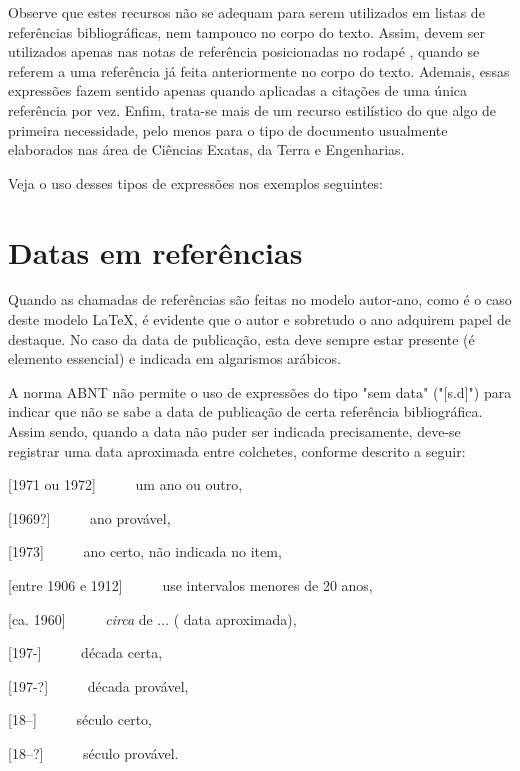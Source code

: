 \begin{apendicesenv}
Observe que estes recursos não se adequam para serem utilizados em listas de referências bibliográficas, nem tampouco no corpo do texto. Assim, devem ser utilizados apenas nas notas de referência posicionadas no rodapé \cite[p.~6]{abnTeX22014c}, quando se referem a uma referência já feita anteriormente no corpo do texto. Ademais, essas expressões fazem sentido apenas quando aplicadas a citações de uma única referência por vez. Enfim, trata-se mais de um recurso estilístico do que algo de primeira necessidade, pelo menos para o tipo de documento usualmente elaborados nas área de Ciências Exatas, da Terra e Engenharias.

Veja o uso desses tipos de expressões nos exemplos seguintes:







\section{Datas em referências}
\label{sec:datas_em_referencias}

Quando as chamadas de referências são feitas no modelo autor-ano, como é o caso deste modelo \LaTeX{}, é evidente que o autor e sobretudo o ano adquirem papel de destaque. No caso da data de publicação, esta deve sempre estar presente (é elemento essencial) e indicada em algarismos arábicos.

A norma ABNT não permite o uso de expressões do tipo "sem data"{} ("[s.d]") para indicar que não se sabe a data de publicação de certa referência bibliográfica. Assim sendo, quando a data não puder ser indicada precisamente, deve-se registrar uma data aproximada entre colchetes, conforme descrito a seguir:

[1971 ou 1972] \ \ \ \ \ um ano ou outro,

[1969?] \ \ \ \ \ ano provável,

[1973] \ \ \ \ \ ano certo, não indicada no item,

[entre 1906 e 1912] \ \ \ \ \ use intervalos menores de 20 anos,

[ca. 1960] \ \ \ \ \ \textit{circa} de ... ( data aproximada),

[197-] \ \ \ \ \ década certa,

[197-?] \ \ \ \ \ década provável,

[18--] \ \ \ \ \ século certo,

[18--?] \ \ \ \ \ século provável.

\end{apendicesenv}
